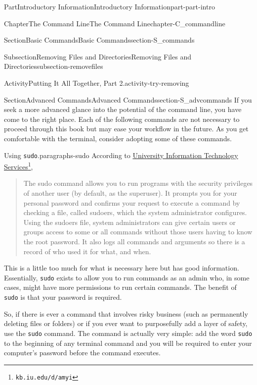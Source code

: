 \documentclass[oneside,10pt,]{book}
\newcommand{\mono}[1]{\texttt{#1}}
\begin{document}
\begin{partptx}{Part}{Introductory Information}{}{Introductory Information}{}{}{part-part-intro}
\begin{chapterptx}{Chapter}{The Command Line}{}{The Command Line}{}{}{chapter-C_commandline}
\begin{sectionptx}{Section}{Basic Commands}{}{Basic Commands}{}{}{section-S_commands}
\begin{subsectionptx}{Subsection}{Removing Files and Directories}{}{Removing Files and Directories}{}{}{subsection-removefiles}
\begin{activity}{Activity}{Putting It All Together, Part 2.}{activity-try-removing}
\begin{enumerate}[font=\bfseries,label=(\alph*),ref=\alph*]
\end{enumerate}%
\end{activity}%
\end{subsectionptx}
\end{sectionptx}
%
%
\typeout{************************************************}
\typeout{************************************************}
%
\begin{sectionptx}{Section}{Advanced Commands}{}{Advanced Commands}{}{}{section-S_advcommands}
%
%
%
If you seek a more advanced glance into the potential of the command line, you have come to the right place. Each of the following commands are not necessary to proceed through this book but may ease your workflow in the future. As you get comfortable with the terminal, consider adopting some of these commands.%
\begin{paragraphs}{Using \mono{sudo}.}{paragraphs-sudo}%
%
%
According to \href{https://kb.iu.edu/d/amyi}{University Information Technology Services}\footnote{\nolinkurl{kb.iu.edu/d/amyi}\label{fn-sudo-d-b}},%
\begin{quote}%
The sudo command allows you to run programs with the security privileges of another user (by default, as the superuser). It prompts you for your personal password and confirms your request to execute a command by checking a file, called sudoers, which the system administrator configures. Using the sudoers file, system administrators can give certain users or groups access to some or all commands without those users having to know the root password. It also logs all commands and arguments so there is a record of who used it for what, and when.%
\end{quote}
This is a little too much for what is necessary here but has good information. Essentially, \mono{sudo} exists to allow you to run commands as an admin who, in some cases, might have more permissions to run certain commands. The benefit of \mono{sudo} is that your password is required.%
\par
So, if there is ever a command that involves risky business (such as permanently deleting files or folders) or if you ever want to purposefully add a layer of safety, use the \mono{sudo} command. The command is actually very simple: add the word \mono{sudo} to the beginning of any terminal command and you will be required to enter your computer's password before the command executes.%

\end{paragraphs}
\end{sectionptx}
\end{chapterptx}
\end{partptx}
\end{document}
